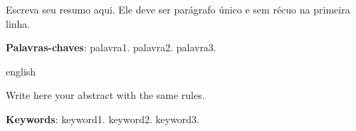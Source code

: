 \setlength{\absparsep}{18pt} %
\begin{resumo}

Escreva seu resumo aqui. Ele deve ser parágrafo único e sem récuo na primeira linha.
 \lipsum[1-1]
 
 \noindent
 \textbf{Palavras-chaves}: palavra1. palavra2. palavra3. 
\end{resumo}
\begin{resumo}[Abstract]
	\begin{otherlanguage*}{english}
	
	Write here your abstract with the same rules.
	\lipsum[1-1]
	
	\vspace{\onelineskip}
	\noindent 
	\textbf{Keywords}: keyword1. keyword2. keyword3.
	\end{otherlanguage*}
\end{resumo}